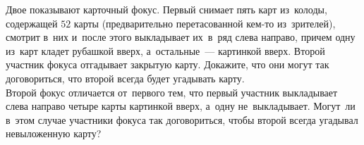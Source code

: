 \begin{problems}
\item
\subproblem
Двое показывают карточный фокус.
Первый снимает пять карт из~колоды, содержащей $52$ карты (предварительно
перетасованной кем-то из~зрителей), смотрит в~них и~после этого выкладывает
их~в~ряд слева направо, причем одну из~карт кладет рубашкой вверх,
а~остальные~— картинкой вверх.
Второй участник фокуса отгадывает закрытую карту.
Докажите, что они могут так договориться, что второй всегда будет угадывать
карту.
\\
\subproblem
Второй фокус отличается от~первого тем, что первый участник выкладывает слева
направо четыре карты картинкой вверх, а~одну не~выкладывает.
Могут~ли в~этом случае участники фокуса так договориться, чтобы второй всегда
угадывал невыложенную карту?

\end{problems}

